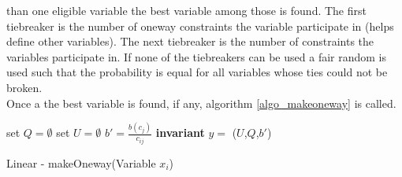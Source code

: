 than one eligible variable the best variable among those is found. The first tiebreaker is the number of oneway 
constraints the variable participate in (helps define other variables). The next tiebreaker is the number of constraints 
the variables participate in. If none of the tiebreakers can be used a fair random is used such that the probability is 
equal for all variables whose ties could not be broken. \\ 
Once a the best variable is found, if any, algorithm \ref{algo_makeoneway} \makeOneway is called. \\
\IncMargin{1em}
\begin{algorithm}[H]
\algdata
{}
\BlankLine
set $Q = \emptyset$ 
set $U = \emptyset$ 
\int $b' = \frac{b(c_j)}{c_{ij}}$ \; 
\textbf{invariant} $y = $ \Sum($U$,$Q$,$b'$)\; 

 \caption{Linear - makeOneway(\textsf{Variable} $x_i$)} \label{algo_makeoneway}
\end{algorithm}\DecMargin{1em} \noindent
